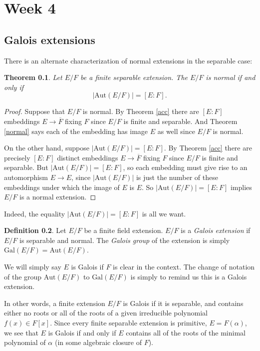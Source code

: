 \documentclass[12pt]{report}
\newtheorem{theorem}{Theorem}[section]
\theoremstyle{definition}
\newtheorem{definition}[theorem]{Definition}
\newcommand{\Aut}{\text{Aut}}
\newcommand{\Gal}{\text{Gal}}
\begin{document}
\chapter*{Week 4}
\setcounter{chapter}{4}

\section{Galois extensions}

There is an alternate characterization of normal extensions in the separable case:

\begin{theorem}\label{num1}
	Let $E/F$ be a finite separable extension. The $E/F$ is normal if and only if $$|\Aut(E/F)|=[E:F].$$
\end{theorem}

\begin{proof}
	Suppose that $E/F$ is normal. By Theorem \ref{acc} there are $[E:F]$ embeddings $E\to \overline{F}$ fixing $F$ since $E/F$ is finite and separable. And Theorem \ref{normal} says each of the embedding has image $E$ as well since $E/F$ is normal.

	On the other hand, suppose $|\Aut(E/F)| = [E:F]$. By Theorem \ref{acc} there are precisely $[E:F]$ distinct embeddings $E\to \overline{F}$ fixing $F$ since $E/F$ is finite and separable. But $|\Aut(E/F)| = [E:F]$, so each embedding must give rise to an automorphism $E\to E$, since $|\Aut(E/F)|$ is just the number of these embeddings under which the image of $E$ is $E$. So $|\Aut(E/F)| = [E:F]$ implies $E/F$ is a normal extension.
\end{proof}

Indeed, the equality $|\Aut(E/F)|=[E:F]$ is all we want.

\begin{definition}
	Let $E/F$ be a finite field extension. $E/F$ is a \emph{Galois extension} if $E/F$ is separable and normal. The \emph{Galois group} of the extension is simply $\Gal(E/F)=\Aut(E/F)$.
\end{definition}

We will simply say $E$ is Galois if $F$ is clear in the context. The change of notation of the group $\Aut(E/F)$ to $\Gal(E/F)$ is simply to remind us this is a Galois extension.

In other words, a finite extension $E/F$ is Galois if it is separable, and contains either no roots or all of the roots of a given irreducible polynomial $f(x)\in F[x]$. Since every finite separable extension is primitive, $E = F(\alpha)$, we see that $E$ is Galois if and only if $E$ contains all of the roots of the minimal polynomial of $\alpha$ (in some algebraic closure of $F$).
\end{document}
